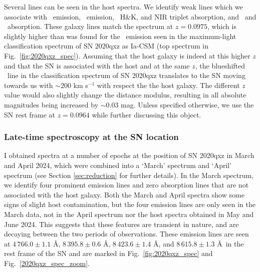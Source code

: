 \documentclass[a4paper,oneside,12pt, class=Latex/Classes/PhDthesisPSnPDF, crop=false]{standalone}
\begin{document}
Several lines can be seen in the host spectra. We identify weak lines which we associate with \Halpha\ emission, \SIIF\ emission, \CaII\ H\&K, and NIR triplet absorption, and \NaID\ and \MgI\ absorption. These galaxy lines match the spectrum at $z=0.0975$, which is slightly higher than was found for the \Halpha\ emission seen in the maximum-light classification spectrum of SN 2020qxz as Ia-CSM (top spectrum in Fig.~\ref{fig:2020qxz_spec}). Assuming that the host galaxy is indeed at this higher $z$ and that the SN is associated with the host and at the same $z$, the blueshifted \Halpha\ line in the classification spectrum of SN 2020qxz translates to the SN moving towards us with $\sim200$ km s$^{-1}$ with respect the the host galaxy. The different $z$ value would also slightly change the distance modulus, resulting in all absolute magnitudes being increased by $\sim0.03$ mag. Unless specified otherwise, we use the SN rest frame at $z=0.0964$ while further discussing this object.


\subsubsection{Late-time spectroscopy at the SN location}
\label{2020qxz_spec}
I obtained spectra at a number of epochs at the position of SN 2020qxz in March and April 2024, which were combined into a `March' spectrum and `April' spectrum (see Section \ref{sec:reduction} for further details). In the March spectrum, we identify four prominent emission lines and zero absorption lines that are not associated with the host galaxy. Both the March and April spectra show some signs of slight host contamination, but the four emission lines are only seen in the March data, not in the April spectrum nor the host spectra obtained in May and June 2024. This suggests that these features are transient in nature, and are decaying between the two periods of observations. These emission lines are seen at $4\,766.0\pm1.1$ \AA, $8\,395.8\pm0.6$ \AA,  $8\,423.6\pm1.4$ \AA, and $8\,615.8\pm1.3$ \AA\ in the rest frame of the SN and are marked in Fig.~\ref{fig:2020qxz_spec} and Fig.~\ref{2020qxz_spec_zoom}.
\end{document}
